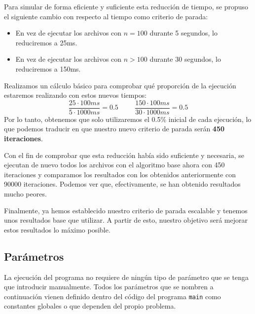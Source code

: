 Para simular de forma eficiente y suficiente esta reducción de tiempo, se propuso el siguiente cambio con respecto al tiempo como criterio de parada:
\begin{itemize}
	\item En vez de ejecutar los archivos con $n=100$ durante 5 segundos, lo reduciremos a 25ms.
	\item En vez de ejecutar los archivos con $n>100$ durante 30 segundos, lo reduciremos a 150ms.
\end{itemize}
Realizamos un cálculo básico para comprobar qué proporción de la ejecución estaremos realizando con estos nuevos tiempos:
\begin{equation*}
\dfrac{25\cdot 100ms}{5\cdot 1000ms} = 0.5
\hspace{1cm}
\dfrac{150\cdot 100ms}{30\cdot 1000ms} = 0.5
\end{equation*}
Por lo tanto, obtenemos que solo utilizaremos el 0.5\% inicial de cada ejecución, lo que podemos traducir en que nuestro nuevo criterio de parada serán \textbf{450 iteraciones}. 

Con el fin de comprobar que esta reducción había sido suficiente y necesaria, se ejecutan de nuevo todos los archivos con el algoritmo base ahora con 450 iteraciones y comparamos los resultados con los obtenidos anteriormente con 90000 iteraciones. 
Podemos ver que, efectivamente, se han obtenido resultados mucho peores. 

Finalmente, ya hemos establecido nuestro criterio de parada escalable y tenemos unos resultados base que utilizar. 
A partir de esto, nuestro objetivo será mejorar estos resultados lo máximo posible.

\subsection{Parámetros}

La ejecución del programa no requiere de ningún tipo de parámetro que se tenga que introducir manualmente. 
Todos los parámetros que se nombren a continuación vienen definido dentro del código del programa \texttt{main} como constantes globales o que dependen del propio problema. 

